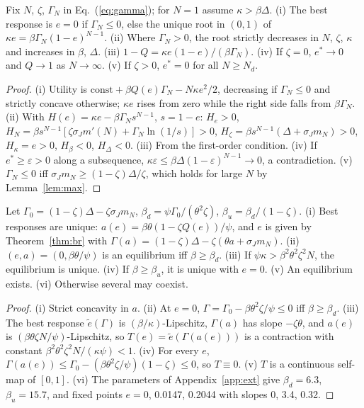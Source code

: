 \documentclass[acmsmall,screen,review]{acmart}
\theoremstyle{acmdefinition}
\begin{document}
\begin{theorem}\label{thm:br}
Fix $N$, $\zeta$, $\Gamma_N$ in Eq.~(\ref{eq:gamma}); for $N = 1$ assume $\kappa > \beta\Delta$. (i) The best response is $e = 0$ if $\Gamma_N \le 0$, else the unique root in $(0,1)$ of $\kappa e = \beta\Gamma_N(1-e)^{N-1}$. (ii) Where $\Gamma_N > 0$, the root strictly decreases in $N$, $\zeta$, $\kappa$ and increases in $\beta$, $\Delta$. (iii) $1 - Q = \kappa e(1-e)/(\beta\Gamma_N)$. (iv) If $\zeta = 0$, $e^* \to 0$ and $Q \to 1$ as $N \to \infty$. (v) If $\zeta > 0$, $e^* = 0$ for all $N \ge N_d$.
\end{theorem}
\begin{proof}
(i) Utility is $\text{const} + \beta Q(e)\Gamma_N - N\kappa e^2/2$, decreasing if $\Gamma_N \le 0$ and strictly concave otherwise; $\kappa e$ rises from zero while the right side falls from $\beta\Gamma_N$. (ii) With $H(e) = \kappa e - \beta\Gamma_N s^{N-1}$, $s = 1-e$: $H_e > 0$, $H_N = \beta s^{N-1}[\zeta\sigma_J m'(N) + \Gamma_N\ln(1/s)] > 0$, $H_\zeta = \beta s^{N-1}(\Delta + \sigma_J m_N) > 0$, $H_\kappa = e > 0$, $H_\beta < 0$, $H_\Delta < 0$. (iii) From the first-order condition. (iv) If $e^* \ge \varepsilon > 0$ along a subsequence, $\kappa\varepsilon \le \beta\Delta(1-\varepsilon)^{N-1} \to 0$, a contradiction. (v) $\Gamma_N \le 0$ iff $\sigma_J m_N \ge (1-\zeta)\Delta/\zeta$, which holds for large $N$ by Lemma~\ref{lem:max}.
\end{proof}

\begin{theorem}[Equilibrium]\label{thm:eq}
Let $\Gamma_0 = (1-\zeta)\Delta - \zeta\sigma_J m_N$, $\beta_d = \psi\Gamma_0/(\theta^2\zeta)$, $\beta_u = \beta_d/(1-\zeta)$. (i) Best responses are unique: $a(e) = \beta\theta(1 - \zeta Q(e))/\psi$, and $e$ is given by Theorem~\ref{thm:br} with $\Gamma(a) = (1-\zeta)\Delta - \zeta(\theta a + \sigma_J m_N)$. (ii) $(e,a) = (0, \beta\theta/\psi)$ is an equilibrium iff $\beta \ge \beta_d$. (iii) If $\psi\kappa > \beta^2\theta^2\zeta^2N$, the equilibrium is unique. (iv) If $\beta \ge \beta_u$, it is unique with $e = 0$. (v) An equilibrium exists. (vi) Otherwise several may coexist.
\end{theorem}
\begin{proof}
(i) Strict concavity in $a$. (ii) At $e = 0$, $\Gamma = \Gamma_0 - \beta\theta^2\zeta/\psi \le 0$ iff $\beta \ge \beta_d$. (iii) The best response $\tilde{e}(\Gamma)$ is $(\beta/\kappa)$-Lipschitz, $\Gamma(a)$ has slope $-\zeta\theta$, and $a(e)$ is $(\beta\theta\zeta N/\psi)$-Lipschitz, so $T(e) = \tilde{e}(\Gamma(a(e)))$ is a contraction with constant $\beta^2\theta^2\zeta^2N/(\kappa\psi) < 1$. (iv) For every $e$, $\Gamma(a(e)) \le \Gamma_0 - (\beta\theta^2\zeta/\psi)(1-\zeta) \le 0$, so $T \equiv 0$. (v) $T$ is a continuous self-map of $[0,1]$. (vi) The parameters of Appendix~\ref{app:ext} give $\beta_d = 6.3$, $\beta_u = 15.7$, and fixed points $e = 0$, 0.0147, 0.2044 with slopes 0, 3.4, 0.32.
\end{proof}
\end{document}
